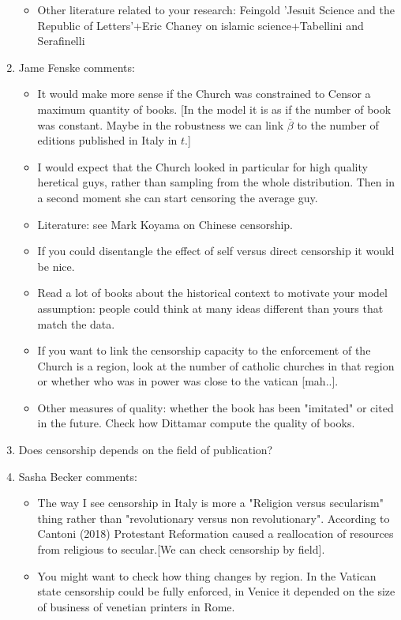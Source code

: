 \begin{enumerate}
\begin{itemize}
		\item Other literature related to your research: Feingold 'Jesuit Science and the Republic of Letters'+Eric Chaney on islamic science+Tabellini and Serafinelli
	\end{itemize}
	\item Jame Fenske comments:
	\begin{itemize}
		\item It would make more sense if the Church was constrained to Censor a maximum quantity of books. [In the model it is as if the number of book was constant. Maybe in the robustness we can link $ \overline{\beta}$ to the number of editions published in Italy in $t$.]
		\item I would expect that the Church looked in particular for high quality heretical guys, rather than sampling from the whole distribution. Then in a second moment she can start censoring the average guy.
		\item Literature: see Mark Koyama on Chinese censorship.
		\item If you could disentangle the effect of self versus direct censorship it would be nice.
		\item Read a lot of books about the historical context to motivate your model assumption: people could think at many ideas different than yours that match the data.
		\item If you want to link the censorship capacity to the enforcement of the Church is a region, look at the number of catholic churches in that region or whether who was in power was close to the vatican [mah..].
		\item Other measures of quality: whether the book has been "imitated" or cited in the future. Check how Dittamar compute the quality of books.
	\end{itemize}
	\item Does censorship depends on the field of publication?
	\item Sasha Becker comments:
	\begin{itemize}
		\item The way I see censorship in Italy is more a "Religion versus secularism" thing rather than "revolutionary versus non revolutionary". According to Cantoni (2018) Protestant Reformation caused a reallocation of resources from religious to secular.[We can check censorship by field].
		\item You might want to check how thing changes by region. In the Vatican state censorship could be fully enforced, in Venice it depended on the size of business of venetian printers in Rome.
	\end{itemize}
	
\end{enumerate}





